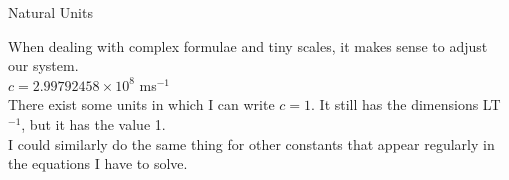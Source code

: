 % 
% 
% 
% 
% 
% 
%


\begin{frame}{Natural Units}
\small

When dealing with complex formulae and tiny scales, it makes sense to adjust our system.\\[1ex]

$c = 2.99792458 \times 10^{8}$ ms$^{-1}$\\[1ex]

There exist some units in which I can write $c=1$. It still has the dimensions LT$^{-1}$, but it has the value 1.\\[1ex]

I could similarly do the same thing for other constants that appear regularly in the equations I have to solve.\\[1ex]

 \end{frame}
 
 
 
 
 
